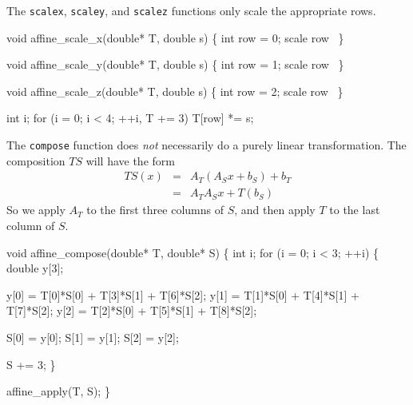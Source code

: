 \nwendcode{}\nwdocspar

The {\tt{}scale{}x}, {\tt{}scale{}y}, and {\tt{}scale{}z} functions only scale
the appropriate rows.

\nwenddocs{}\plusendmoddef
void affine_scale_x(double* T, double s)
\{
    int row = 0;
    \LA{}scale row~{\nwtagstyle{}}\RA{}
\}

void affine_scale_y(double* T, double s)
\{
    int row = 1;
    \LA{}scale row~{\nwtagstyle{}}\RA{}
\}

void affine_scale_z(double* T, double s)
\{
    int row = 2;
    \LA{}scale row~{\nwtagstyle{}}\RA{}
\}

\nwendcode{}\nwdocspar

\nwenddocs{}\endmoddef
int i;
for (i = 0; i < 4; ++i, T += 3)
    T[row] *= s;
\nwendcode{}\nwdocspar

The {\tt{}compose} function does \emph{not} necessarily do a purely
linear transformation.  The composition $TS$ will have the form
\begin{eqnarray*}
  TS(x) & = & A_T (A_S x + b_S) + b_T \\
        & = & A_T A_S x + T(b_S)
\end{eqnarray*}
So we apply $A_T$ to the first three columns of $S$, and then
apply $T$ to the last column of $S$.

\nwenddocs{}\plusendmoddef
void affine_compose(double* T, double* S)
\{
    int i;
    for (i = 0; i < 3; ++i) \{
        double y[3];

        y[0] = T[0]*S[0] + T[3]*S[1] + T[6]*S[2];
        y[1] = T[1]*S[0] + T[4]*S[1] + T[7]*S[2];
        y[2] = T[2]*S[0] + T[5]*S[1] + T[8]*S[2];

        S[0] = y[0];
        S[1] = y[1];
        S[2] = y[2];

        S += 3;
    \}

    affine_apply(T, S);
\}

